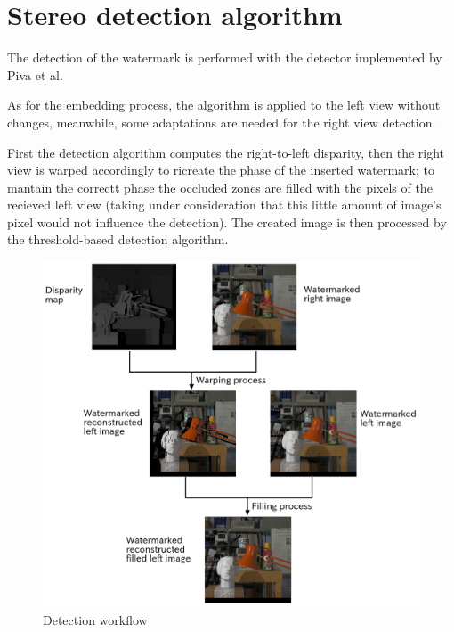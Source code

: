 \section{Stereo detection algorithm}

The detection of the watermark is performed with the detector implemented by Piva et al.\newline

As for the embedding process, the algorithm is applied to the left view without changes, meanwhile, some adaptations are needed for the right view detection.\newline

First the detection algorithm computes the right-to-left disparity, then the right view is warped accordingly to ricreate the phase of the inserted watermark; to mantain the correctt phase the occluded zones are filled with the pixels of the recieved left view (taking under consideration that this little amount of image's pixel would not influence the detection).\newline
The created image is then processed by the threshold-based detection algorithm.\newline 

\begin{figure}[h!]
\centering
\includegraphics[width=1\textwidth]{./img/detection_workflow.png}
\caption{\small{Detection workflow}}
\label{fig:detflow}
\end{figure}

